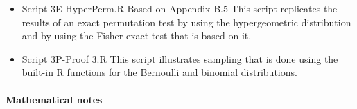 \documentclass[12pt]{article}
\begin{document}
\begin{itemize}
\item Script 3E-HyperPerm.R     Based on Appendix B.5
This script replicates the results of an exact permutation test by using the hypergeometric distribution and by using the Fisher exact test that is based on it.

\item Script 3P-Proof 3.R
This script illustrates sampling that is done using the built-in R functions for the Bernoulli and binomial distributions.






\end{itemize}

\pagebreak





\paragraph*{Mathematical notes}
\end{document}
